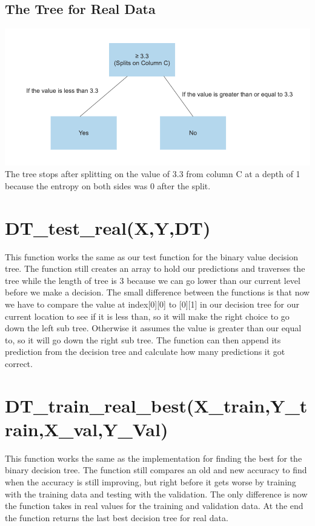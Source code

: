 \documentclass{article}
\begin{document}
\subsection{The Tree for Real Data}
\includegraphics[scale = 0.85]{RealDataTree.png}
The tree stops after splitting on the value of 3.3 from column C at a depth of 1 because the entropy on both sides was 0 after the split.

\section{DT\_test\_real(X,Y,DT)}
This function works the same as our test function for the binary value decision tree. The function still creates an array to hold our predictions and traverses the tree while the length of tree is 3 because we can go lower than our current level before we make a decision. The small difference between the functions is that now we have to compare the value at index[0][0] to [0][1] in our decision tree for our current location to see if it is less than, so it will make the right choice to go down the left sub tree. Otherwise it assumes the value is greater than our equal to, so it will go down the right sub tree. The function can then append its prediction from the decision tree and calculate how many predictions it got correct. 

\section{DT\_train\_real\_best(X\_train,Y\_train,X\_val,Y\_Val)}
This function works the same as the implementation for finding the best for the binary decision tree. The function still compares an old and new accuracy to find when the accuracy is still improving, but right before it gets worse by training with the training data and testing with the validation. The only difference is now the function takes in real values for the training and validation data. At the end the function returns the last best decision tree for real data. 
\end{document}
